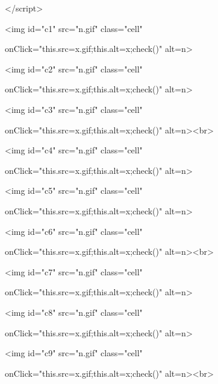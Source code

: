 \documentclass[
]{article}
\begin{document}
\textless/script\textgreater{}

\textless img id="c1" src="n.gif" class="cell"

onClick="this.src=\textquotesingle x.gif\textquotesingle;this.alt=\textquotesingle x\textquotesingle;check()"
alt=\textquotesingle n\textquotesingle\textgreater{}

\textless img id="c2" src="n.gif" class="cell"

onClick="this.src=\textquotesingle x.gif\textquotesingle;this.alt=\textquotesingle x\textquotesingle;check()"
alt=\textquotesingle n\textquotesingle\textgreater{}

\textless img id="c3" src="n.gif" class="cell"

onClick="this.src=\textquotesingle x.gif\textquotesingle;this.alt=\textquotesingle x\textquotesingle;check()"
alt=\textquotesingle n\textquotesingle\textgreater\textless br\textgreater{}

\textless img id="c4" src="n.gif" class="cell"

onClick="this.src=\textquotesingle x.gif\textquotesingle;this.alt=\textquotesingle x\textquotesingle;check()"
alt=\textquotesingle n\textquotesingle\textgreater{}

\textless img id="c5" src="n.gif" class="cell"

onClick="this.src=\textquotesingle x.gif\textquotesingle;this.alt=\textquotesingle x\textquotesingle;check()"
alt=\textquotesingle n\textquotesingle\textgreater{}

\textless img id="c6" src="n.gif" class="cell"

onClick="this.src=\textquotesingle x.gif\textquotesingle;this.alt=\textquotesingle x\textquotesingle;check()"
alt=\textquotesingle n\textquotesingle\textgreater\textless br\textgreater{}

\textless img id="c7" src="n.gif" class="cell"

onClick="this.src=\textquotesingle x.gif\textquotesingle;this.alt=\textquotesingle x\textquotesingle;check()"
alt=\textquotesingle n\textquotesingle\textgreater{}

\textless img id="c8" src="n.gif" class="cell"

onClick="this.src=\textquotesingle x.gif\textquotesingle;this.alt=\textquotesingle x\textquotesingle;check()"
alt=\textquotesingle n\textquotesingle\textgreater{}

\textless img id="c9" src="n.gif" class="cell"

onClick="this.src=\textquotesingle x.gif\textquotesingle;this.alt=\textquotesingle x\textquotesingle;check()"
alt=\textquotesingle n\textquotesingle\textgreater\textless br\textgreater{}
\end{document}
